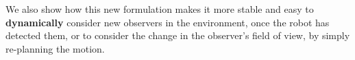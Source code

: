     We also show how this new formulation makes it more stable and easy to \textbf{dynamically} consider new observers in the environment,
    once the robot has detected them,
    or to consider the change in the observer's field of view, by simply re-planning the motion.



%


